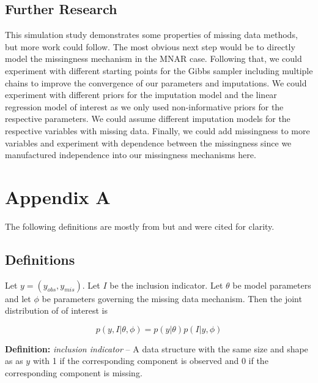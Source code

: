 \documentclass[11pt]{article}
\begin{document}
\subsection{Further Research}

This simulation study demonstrates some properties of missing data methods, but more work could follow. The most obvious next step would be to directly model the missingness mechanism in the MNAR case. Following that, we could experiment with different starting points for the Gibbs sampler including multiple chains to improve the convergence of our parameters and imputations. We could experiment with different priors for the imputation model and the linear regression model of interest as we only used non-informative priors for the respective parameters. We could assume different imputation models for the respective variables with missing data. Finally, we could add missingness to more variables and experiment with dependence between the missingness since we manufactured independence into our missingness mechanisms here.

\newpage




\newpage
\section{Appendix A}

The following definitions are mostly from \cite{gelman2021} but \cite{little2020} and \cite{vanBurren2018} were cited for clarity. 

\subsection{Definitions}

Let $y = (y_{obs}, y_{mis})$. Let $I$ be the inclusion indicator. Let $\theta$ be model parameters and let $\phi$ be parameters governing the missing data mechanism. Then the joint distribution of of interest is 

$$p(y, I|\theta, \phi) = p(y|\theta)p(I|y, \phi)$$

\vspace{0.25in}

\textbf{Definition:} \textit{inclusion indicator} -- A data structure with the same size and shape as as $y$ with 1 if the corresponding component is observed and 0 if the corresponding component is missing.

\vspace{0.25in}
\end{document}
